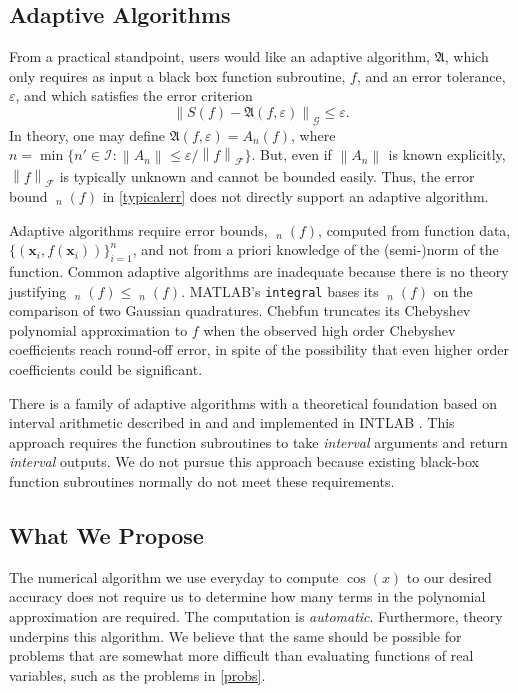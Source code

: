 \documentclass[11pt]{NSFamsart}
\DeclareMathOperator{\err}{err}
\DeclareMathOperator{\oerr}{\overline{\err}}
\DeclareMathOperator{\herr}{\widehat{\err}}
\newcommand{\bx}{{\boldsymbol{x}}}
\newcommand{\calf}{{\mathcal{F}}}
\newcommand{\calI}{{\mathcal{I}}}
\newcommand{\calg}{{\mathcal{G}}}
\newcommand{\fA}{\mathfrak{A}}
\newcommand{\norm}[2][{}]{\ensuremath{\left \lVert #2 \right \rVert}_{#1}}
\begin{document}
\subsection{Adaptive Algorithms} From a practical standpoint, users would like an adaptive 
algorithm, 
$\fA$, which only requires as input a black box function subroutine, $f$, and an error tolerance, 
$\varepsilon$, and which satisfies the error criterion
\begin{equation} \label{errorcrit} \tag{CRIT}
\norm[\calg]{S(f) - \fA(f,\varepsilon)} \le \varepsilon.
\end{equation}
In theory, one may define $\fA(f,\varepsilon) = A_n(f)$, where $n = \min \{ n' \in \calI : \norm{A_n} \le 
\varepsilon / 
\norm[\calf]{f}\}$.  But, even if $\norm{A_n}$ is known explicitly, $\norm[\calf]{f}$ is 
typically 
unknown and cannot be 
bounded easily.  Thus, the error bound $\oerr_n(f)$ in \eqref{typicalerr} does not directly support an 
adaptive algorithm.

Adaptive algorithms require error bounds, $\herr_n(f)$, computed from function data, 
$\{(\bx_i,f(\bx_i))\}_{i=1}^n$, and not from a priori knowledge of the (semi-)norm of the function.  
Common adaptive algorithms are inadequate because there is no theory justifying
$\oerr_n(f)  \le \herr_n(f)$.  MATLAB's \texttt{integral} bases its $\herr_n(f)$ on 
the comparison of two Gaussian quadratures.  Chebfun truncates its Chebyshev polynomial 
approximation to $f$ when the observed high order Chebyshev coefficients reach round-off 
error, in spite of the possibility that even higher order coefficients could be significant.

There is a family of adaptive algorithms with a theoretical foundation based on interval 
arithmetic described in \cite{MoKeCl09} and \cite{Rum10a} and implemented in INTLAB 
\cite{Rum99a}.  This approach requires the function subroutines to take \emph{interval} arguments 
and return \emph{interval} outputs.  We do not pursue this approach because existing black-box 
function subroutines normally do not meet these requirements.

\subsection{What We Propose}
The numerical algorithm we use everyday to compute $\cos(x)$ to our desired accuracy does 
not require us to determine how many terms in the polynomial 
approximation are required.  The computation is \emph{automatic}.  Furthermore, theory 
underpins this algorithm.  We believe that the same should be possible for problems that are 
somewhat more difficult than evaluating  functions of real variables, such as the problems in 
\eqref{probs}.  
\end{document}
